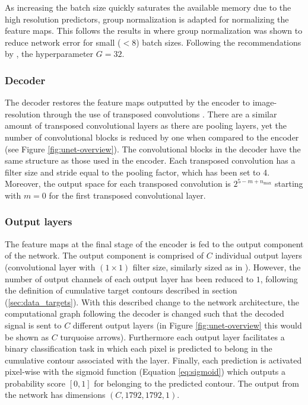 \documentclass[../main/thesis]{subfiles}
\begin{document}
As increasing the batch size quickly saturates the available memory due to the high resolution predictors, group normalization is adapted for normalizing the feature maps. This follows the results in \citet{Wu2018} where group normalization was shown to reduce network error for small ($<8$) batch sizes. Following the recommendations by \citet{Wu2018}, the hyperparameter $G=32$. 

\subsubsection{Decoder}
The decoder restores the feature maps outputted by the encoder to image-resolution through the use of transposed convolutions \citep{Zeiler2010}. There are a similar amount of transposed convolutional layers as there are pooling layers, yet the number of convolutional blocks is reduced by one when compared to the encoder (see Figure \ref{fig:unet-overview}). The convolutional blocks in the decoder have the same structure as those used in the encoder. Each transposed convolution has a filter size and stride equal to the pooling factor, which has been set to 4. Moreover, the output space for each transposed convolution is $2^{5 - m + n_{\text{max}}}$ starting with $m = 0$ for the first transposed convolutional layer.

\subsubsection{Output layers}
\label{sec:architecture-output}
The feature maps at the final stage of the encoder is fed to the output component of the network. The output component is comprised of $C$ individual output layers (convolutional layer with $(1 \times 1)$ filter size, similarly sized as in \citet{Ronneberger2015}). However, the number of output channels of each output layer has been reduced to $1$, following the definition of cumulative target contours described in section (\ref{sec:data_targets}). With this described change to the network architecture, the computational graph following the decoder is changed such that the decoded signal is sent to $C$ different output layers (in Figure \ref{fig:unet-overview} this would be shown as $C$ turquoise arrows). Furthermore each output layer facilitates a binary classification task in which each pixel is predicted to belong in the cumulative contour associated with the layer. Finally, each prediction is activated pixel-wise with the sigmoid function (Equation \ref{eq:sigmoid}) which outputs a probability score $\left[0, 1\right]$ for belonging to the predicted contour. The output from the network has dimensions $(C, 1792, 1792, 1)$.
\end{document}
